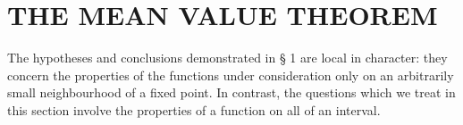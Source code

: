 \section{THE MEAN VALUE THEOREM}

The hypotheses and conclusions demonstrated in § 1 are local in character: they concern the properties of the functions under consideration only on an arbitrarily small neighbourhood of a fixed point. In contrast, the questions which we treat in this section involve the properties of a function on all of an interval.

